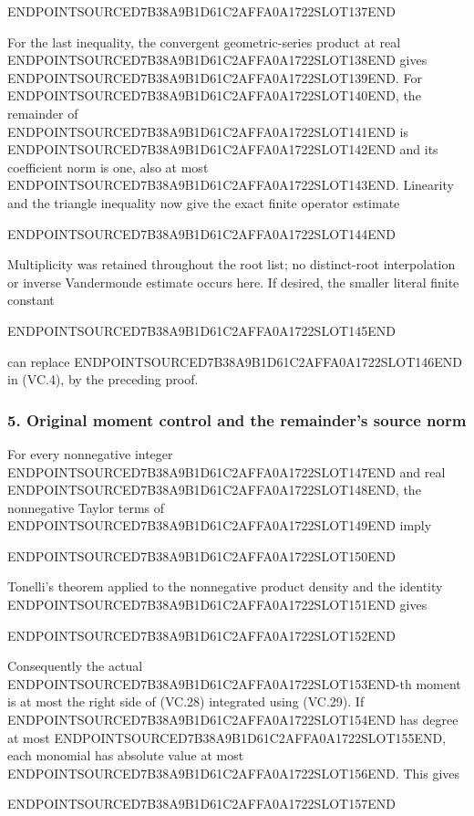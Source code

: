 ENDPOINTSOURCED7B38A9B1D61C2AFFA0A1722SLOT137END

For the last inequality, the convergent geometric-series product at real ENDPOINTSOURCED7B38A9B1D61C2AFFA0A1722SLOT138END gives ENDPOINTSOURCED7B38A9B1D61C2AFFA0A1722SLOT139END. For ENDPOINTSOURCED7B38A9B1D61C2AFFA0A1722SLOT140END, the remainder of ENDPOINTSOURCED7B38A9B1D61C2AFFA0A1722SLOT141END is ENDPOINTSOURCED7B38A9B1D61C2AFFA0A1722SLOT142END and its coefficient norm is one, also at most ENDPOINTSOURCED7B38A9B1D61C2AFFA0A1722SLOT143END. Linearity and the triangle inequality now give the exact finite operator estimate

ENDPOINTSOURCED7B38A9B1D61C2AFFA0A1722SLOT144END

Multiplicity was retained throughout the root list; no distinct-root interpolation or inverse Vandermonde estimate occurs here. If desired, the smaller literal finite constant

ENDPOINTSOURCED7B38A9B1D61C2AFFA0A1722SLOT145END

can replace ENDPOINTSOURCED7B38A9B1D61C2AFFA0A1722SLOT146END in (VC.4), by the preceding proof.

\subsubsection{5. Original moment control and the remainder's source norm}\label{endpoint-volume_connection_original--original-moment-control-and-the-remainders-source-norm}

For every nonnegative integer ENDPOINTSOURCED7B38A9B1D61C2AFFA0A1722SLOT147END and real ENDPOINTSOURCED7B38A9B1D61C2AFFA0A1722SLOT148END, the nonnegative Taylor terms of ENDPOINTSOURCED7B38A9B1D61C2AFFA0A1722SLOT149END imply

ENDPOINTSOURCED7B38A9B1D61C2AFFA0A1722SLOT150END

Tonelli's theorem applied to the nonnegative product density and the identity ENDPOINTSOURCED7B38A9B1D61C2AFFA0A1722SLOT151END gives

ENDPOINTSOURCED7B38A9B1D61C2AFFA0A1722SLOT152END

Consequently the actual ENDPOINTSOURCED7B38A9B1D61C2AFFA0A1722SLOT153END-th moment is at most the right side of (VC.28) integrated using (VC.29). If ENDPOINTSOURCED7B38A9B1D61C2AFFA0A1722SLOT154END has degree at most ENDPOINTSOURCED7B38A9B1D61C2AFFA0A1722SLOT155END, each monomial has absolute value at most ENDPOINTSOURCED7B38A9B1D61C2AFFA0A1722SLOT156END. This gives

ENDPOINTSOURCED7B38A9B1D61C2AFFA0A1722SLOT157END

